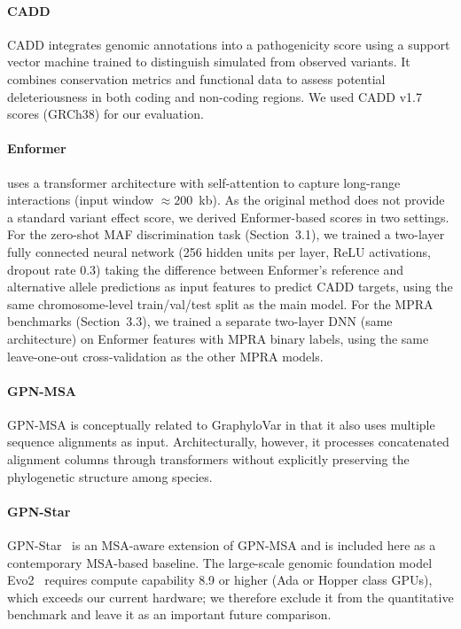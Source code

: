 \documentclass[unnumsec,webpdf,contemporary,large]{oup-authoring-template}%
\newcommand{\rev}[1]{{\color{red}#1}}
\theoremstyle{thmstyleone}%
\theoremstyle{thmstyletwo}%
\theoremstyle{thmstylethree}%
\begin{document}
\paragraph{CADD \citep{kircher2014general}} CADD integrates genomic annotations into a pathogenicity score using a support vector machine trained to distinguish simulated from observed variants. It combines conservation metrics and functional data to assess potential deleteriousness in both coding and non-coding regions. We used CADD v1.7 scores (GRCh38) for our evaluation.

\paragraph{Enformer \citep{avsec2021effective}} uses a transformer architecture with self-attention to capture long-range interactions (input window $\approx 200$~kb). As the original method does not provide a standard variant effect score, we derived Enformer-based scores in two settings. For the zero-shot MAF discrimination task (Section~3.1), we trained a two-layer fully connected neural network (256 hidden units per layer, ReLU activations, dropout rate 0.3) taking the difference between Enformer's reference and alternative allele predictions as input features to predict CADD targets, using the same chromosome-level train/val/test split as the main model. For the MPRA benchmarks (Section~3.3), we trained a separate two-layer DNN (same architecture) on Enformer features with MPRA binary labels, using the same leave-one-out cross-validation as the other MPRA models.

\paragraph{\rev{GPN-MSA \citep{benegas2024gpnmsa}}} \rev{GPN-MSA is conceptually related to GraphyloVar in that it also uses multiple sequence alignments as input. Architecturally, however, it processes concatenated alignment columns through transformers without explicitly preserving the phylogenetic structure among species.}

\paragraph{\rev{GPN-Star}} \rev{GPN-Star~\citep{benegas2024gpnmsa} is an MSA-aware extension of GPN-MSA and is included here as a contemporary MSA-based baseline. The large-scale genomic foundation model Evo2~\citep{nguyen2024sequence} requires compute capability 8.9 or higher (Ada or Hopper class GPUs), which exceeds our current hardware; we therefore exclude it from the quantitative benchmark and leave it as an important future comparison.}
\end{document}
